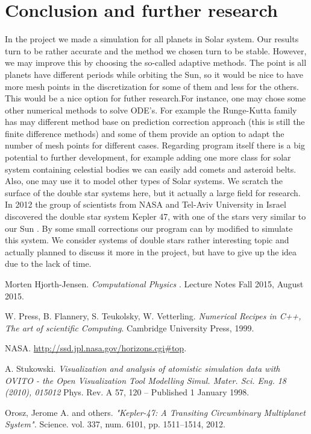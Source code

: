 \documentclass[10pt]{article}
\begin{document}
\newpage
\clearpage
\section{Conclusion and further research}\label{conc}
In the project we made a simulation for all planets in Solar system. Our results turn to be rather accurate and the method we chosen turn to be stable. However, we may improve this by choosing the so-called adaptive methods. The point is all planets have different periods while orbiting the Sun, so it would be nice to have more mesh points in the discretization for some of them and less for the others. This would be a nice option for futher research.For instance, one may chose some other numerical methods to solve ODE's. For example the Runge-Kutta family has may different method base on prediction correction approach (this is still the finite difference methods) and some of them provide an option to adapt the number of mesh points for different cases.
Regarding program itself there is a big potential to further development, for example adding one more class for solar system containing celestial bodies we can easily add comets and asteroid belts. Also, one may use it to model other types of Solar systems. We scratch the surface of the double star systems here, but it actually a large field for research. In 2012 the group of scientists from NASA and Tel-Aviv University in Israel discovered the double star system Kepler 47, with one of the stars very similar to our Sun \cite{kepler}. By some small corrections our program can by modified to simulate this system. We consider systems of double stars rather interesting topic and actually planned to discuss it more in the project, but have to give up the idea due to the lack of time.


\clearpage
\newpage
\begin{thebibliography}{2}
Morten Hjorth-Jensen. 
\textit{Computational Physics
}. 
Lecture Notes Fall 2015, August 2015.

W. Press, B. Flannery, S. Teukolsky, W. Vetterling. 
\textit{Numerical Recipes in C++, The art of scientific Computing}. 
Cambridge University Press, 1999.

NASA.
\url{http://ssd.jpl.nasa.gov/horizons.cgi#top}.


A. Stukowski.
\textit{
Visualization and analysis of atomistic simulation data with OVITO - the Open Visualization Tool
Modelling Simul. Mater. Sci. Eng. 18 (2010), 015012}
Phys. Rev. A 57, 120 – Published 1 January 1998.

Orosz, Jerome A. and others.
\textit
{"Kepler-47: A Transiting Circumbinary Multiplanet System". 
}
Science. vol. 337, num. 6101, pp. 1511--1514, 2012. 
 
\end{thebibliography}
\end{document}
